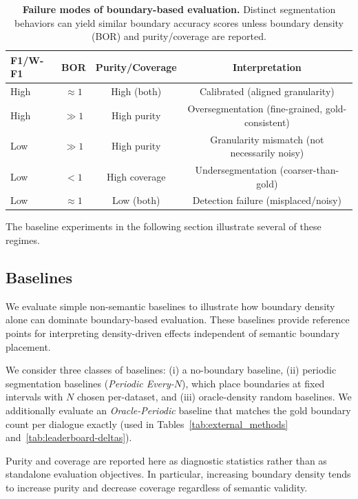 \documentclass{article}
\begin{document}
\begin{table}[t]
  \centering
  \begin{tabular}{lccc}
    \toprule
    F1/W-F1 & BOR & Purity/Coverage & Interpretation \\
    \midrule
    High & $\approx 1$ & High (both) & Calibrated (aligned granularity) \\
    High & $\gg 1$ & High purity & Oversegmentation (fine-grained, gold-consistent) \\
    Low  & $\gg 1$ & High purity & Granularity mismatch (not necessarily noisy) \\
    Low  & $< 1$ & High coverage & Undersegmentation (coarser-than-gold) \\
    Low  & $\approx 1$ & Low (both) & Detection failure (misplaced/noisy) \\
    \bottomrule
  \end{tabular}
  \caption{\textbf{Failure modes of boundary-based evaluation.}
    Distinct segmentation behaviors can yield similar boundary accuracy scores
    unless boundary density (BOR) and purity/coverage are reported.}
  \label{tab:failure-taxonomy}
\end{table}

The baseline experiments in the following section illustrate several
of these regimes.

\subsection{Baselines}
\label{sec:baselines}
We evaluate simple non-semantic baselines to illustrate how boundary
density alone can dominate boundary-based evaluation. These baselines
provide reference points for interpreting density-driven effects
independent of semantic boundary placement.

We consider three classes of baselines: (i) a no-boundary baseline,
(ii) periodic segmentation baselines (\emph{Periodic Every-$N$}), which place
boundaries at fixed intervals with $N$ chosen per-dataset, and (iii) oracle-density
random baselines. We additionally evaluate an \emph{Oracle-Periodic} baseline that
matches the gold boundary count per dialogue exactly (used in Tables~\ref{tab:external_methods}
and~\ref{tab:leaderboard-deltas}).

Purity and coverage are reported here as diagnostic statistics rather than as
standalone evaluation objectives.
In particular, increasing boundary density tends to increase purity and decrease
coverage regardless of semantic validity.
\end{document}
